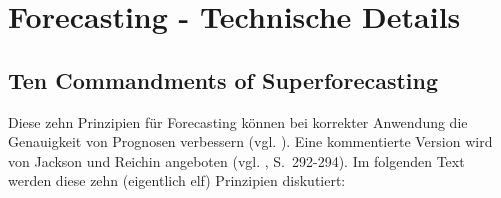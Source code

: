 \chapter{Forecasting - Technische Details}





\section{Ten Commandments of Superforecasting} \label{Ten}

Diese zehn Prinzipien für Forecasting können bei korrekter Anwendung die Genauigkeit von
Prognosen verbessern (vgl. \cite{Ten_Comm}). Eine kommentierte Version wird von Jackson und Reichin
angeboten (vgl. \cite{Jackson}, S.~292-294). Im folgenden Text werden diese zehn (eigentlich elf)
Prinzipien diskutiert:

